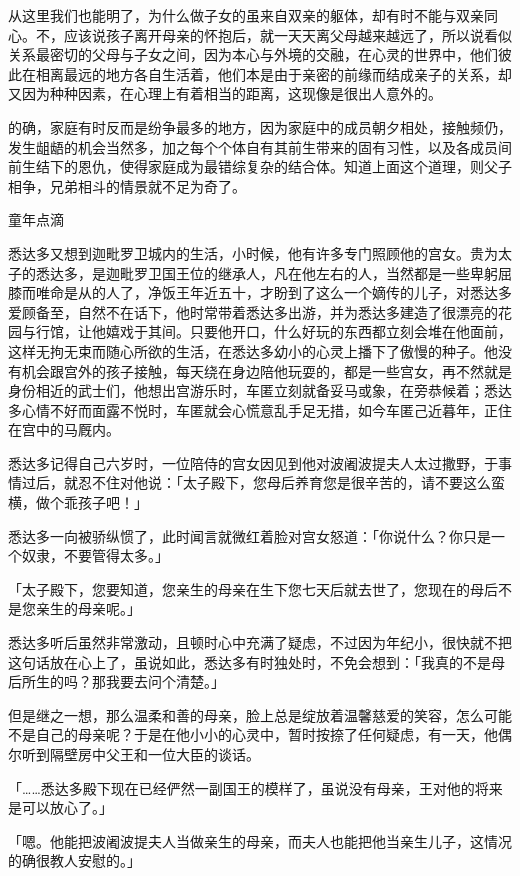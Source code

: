\documentclass[12pt,twoside,openany]{book}
\begin{document}
从这里我们也能明了，为什么做子女的虽来自双亲的躯体，却有时不能与双亲同心。不，应该说孩子离开母亲的怀抱后，就一天天离父母越来越远了，所以说看似关系最密切的父母与子女之间，因为本心与外境的交融，在心灵的世界中，他们彼此在相离最远的地方各自生活着，他们本是由于亲密的前缘而结成亲子的关系，却又因为种种因素，在心理上有着相当的距离，这现像是很出人意外的。

的确，家庭有时反而是纷争最多的地方，因为家庭中的成员朝夕相处，接触频仍，发生龃龉的机会当然多，加之每个个体自有其前生带来的固有习性，以及各成员间前生结下的恩仇，使得家庭成为最错综复杂的结合体。知道上面这个道理，则父子相争，兄弟相斗的情景就不足为奇了。

童年点滴

悉达多又想到迦毗罗卫城内的生活，小时候，他有许多专门照顾他的宫女。贵为太子的悉达多，是迦毗罗卫国王位的继承人，凡在他左右的人，当然都是一些卑躬屈膝而唯命是从的人了，净饭王年近五十，才盼到了这么一个嫡传的儿子，对悉达多爱顾备至，自然不在话下，他时常带着悉达多出游，并为悉达多建造了很漂亮的花园与行馆，让他嬉戏于其间。只要他开口，什么好玩的东西都立刻会堆在他面前，这样无拘无束而随心所欲的生活，在悉达多幼小的心灵上播下了傲慢的种子。他没有机会跟宫外的孩子接触，每天绕在身边陪他玩耍的，都是一些宫女，再不然就是身份相近的武士们，他想出宫游乐时，车匿立刻就备妥马或象，在旁恭候着；悉达多心情不好而面露不悦时，车匿就会心慌意乱手足无措，如今车匿己近暮年，正住在宫中的马厩内。

悉达多记得自己六岁时，一位陪侍的宫女因见到他对波阇波提夫人太过撒野，于事情过后，就忍不住对他说：「太子殿下，您母后养育您是很辛苦的，请不要这么蛮横，做个乖孩子吧！」

悉达多一向被骄纵惯了，此时闻言就微红着脸对宫女怒道：「你说什么？你只是一个奴隶，不要管得太多。」

「太子殿下，您要知道，您亲生的母亲在生下您七天后就去世了，您现在的母后不是您亲生的母亲呢。」

悉达多听后虽然非常激动，且顿时心中充满了疑虑，不过因为年纪小，很快就不把这句话放在心上了，虽说如此，悉达多有时独处时，不免会想到：「我真的不是母后所生的吗？那我要去问个清楚。」

但是继之一想，那么温柔和善的母亲，脸上总是绽放着温馨慈爱的笑容，怎么可能不是自己的母亲呢？于是在他小小的心灵中，暂时按捺了任何疑虑，有一天，他偶尔听到隔壁房中父王和一位大臣的谈话。

「……悉达多殿下现在已经俨然一副国王的模样了，虽说没有母亲，王对他的将来是可以放心了。」

「嗯。他能把波阇波提夫人当做亲生的母亲，而夫人也能把他当亲生儿子，这情况的确很教人安慰的。」
\end{document}

